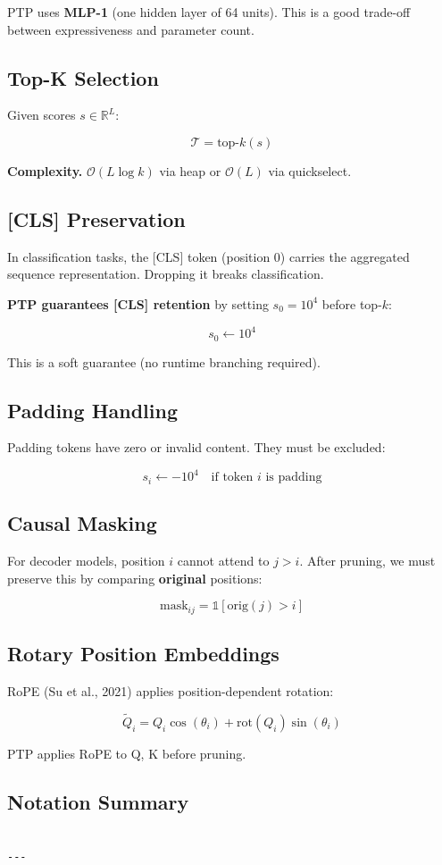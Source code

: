 PTP uses \textbf{MLP-1} (one hidden layer of 64 units). This is a good 
trade-off between expressiveness and parameter count.

\subsection{Top-K Selection}

Given scores $s \in \mathbb{R}^L$:

\[
\mathcal{T} = \text{top-}k(s)
\tag{3.4}
\]

\textbf{Complexity.} $\mathcal{O}(L \log k)$ via heap or $\mathcal{O}(L)$ via 
quickselect.

\subsection{[CLS] Preservation}

In classification tasks, the [CLS] token (position 0) carries the 
aggregated sequence representation. Dropping it breaks classification.

\textbf{PTP guarantees [CLS] retention} by setting $s_0 = 10^4$ before top-$k$:

\[
s_0 \leftarrow 10^4
\tag{3.5}
\]

This is a soft guarantee (no runtime branching required).

\subsection{Padding Handling}

Padding tokens have zero or invalid content. They must be excluded:

\[
s_i \leftarrow -10^4 \quad \text{if token } i \text{ is padding}
\tag{3.6}
\]

\subsection{Causal Masking}

For decoder models, position $i$ cannot attend to $j > i$. After pruning, 
we must preserve this by comparing \textbf{original} positions:

\[
\text{mask}_{ij} = \mathbb{1}[\text{orig}(j) > i]
\tag{3.7}
\]

\subsection{Rotary Position Embeddings}

RoPE (Su et al., 2021) applies position-dependent rotation:

\[
\tilde{Q}_i = Q_i \cos(\theta_i) + \text{rot}(Q_i) \sin(\theta_i)
\tag{3.8}
\]

PTP applies RoPE to Q, K before pruning.

\subsection{Notation Summary}

\begin{lstlisting}

---
\end{lstlisting}